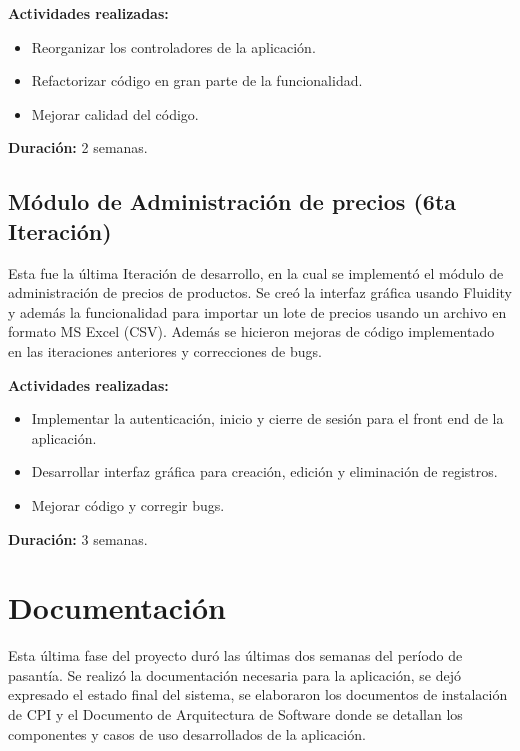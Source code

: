 \textbf{Actividades realizadas:}
\begin{itemize}
   \item Reorganizar los controladores de la aplicación.
   \item Refactorizar código en gran parte de la funcionalidad.
   \item Mejorar calidad del código.
\end{itemize}

\textbf{Duración:} 2 semanas.


\subsection{Módulo de Administración de precios (6ta Iteración)}
Esta fue la última Iteración de desarrollo, en la cual se implementó el módulo de administración de precios de productos. Se creó la interfaz gráfica usando Fluidity y además la funcionalidad para importar un lote de precios usando un archivo en formato MS Excel (CSV). Además se hicieron mejoras de código implementado en las iteraciones anteriores y correcciones de bugs.

\textbf{Actividades realizadas:}
\begin{itemize}
   \item Implementar la autenticación, inicio y cierre de sesión para el front end de la aplicación.
   \item Desarrollar interfaz gráfica para creación, edición y eliminación de registros.
   \item Mejorar código y corregir bugs.
\end{itemize}

\textbf{Duración:} 3 semanas.


\section{Documentación} \label{documentation}
Esta última fase del proyecto duró las últimas dos semanas del período de pasantía. Se realizó la documentación necesaria para la aplicación, se dejó expresado el estado final del sistema, se elaboraron los documentos de instalación de CPI y el Documento de Arquitectura de Software donde se detallan los componentes y casos de uso desarrollados de la aplicación.
